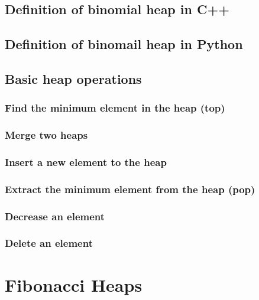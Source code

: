 \documentclass{article}
\begin{document}
\subsection*{Definition of binomial heap in C++}

\subsection*{Definition of binomail heap in Python}

\subsection{Basic heap operations}

\subsubsection{Find the minimum element in the heap (top)}

\subsubsection{Merge two heaps}

\subsubsection{Insert a new element to the heap}

\subsubsection{Extract the minimum element from the heap (pop)}

\subsubsection{Decrease an element}

\subsubsection{Delete an element}

\section{Fibonacci Heaps}
\label{fib-heap}
\end{document}
